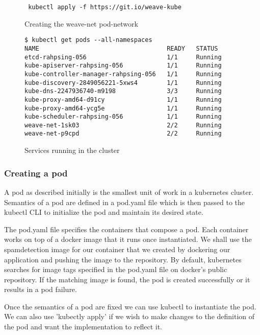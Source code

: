 \documentclass[9pt,twocolumn,twoside]{../../styles/osajnl}
\begin{document}
\begin{figure}[H]
\begin{verbatim}
 kubectl apply -f https://git.io/weave-kube
\end{verbatim}
\caption{Creating the weave-net pod-network}
\label{Creating the weave-net pod-network}
\end{figure}

\begin{figure}[H]
\begin{verbatim}
$ kubectl get pods --all-namespaces
NAME                                   READY   STATUS       
etcd-rahpsing-056                      1/1     Running          
kube-apiserver-rahpsing-056            1/1     Running           
kube-controller-manager-rahpsing-056   1/1     Running           
kube-discovery-2849056221-5xws4        1/1     Running         
kube-dns-2247936740-m9198              3/3     Running           
kube-proxy-amd64-d91cy                 1/1     Running           
kube-proxy-amd64-ycg5e                 1/1     Running           
kube-scheduler-rahpsing-056            1/1     Running           
weave-net-1sk03                        2/2     Running           
weave-net-p9cpd                        2/2     Running           
\end{verbatim}
\caption{Services running in the cluster}
\label{Services running in the cluster}
\end{figure}

\subsubsection{Creating a pod}
A pod as described initially is the smallest unit of work in a
kubernetes cluster. Semantics of a pod are defined in a pod.yaml file
which is then passed to the kubectl CLI to initialize the pod and
maintain its desired state.

The pod.yaml file specifies the containers that compose a pod. Each
container works on top of a docker image that it runs once
instantiated. We shall use the spamdetection image for our container
that we created by dockering our application and pushing the image to
the repository. By default, kubernetes searches for image tags
specified in the pod.yaml file on docker's public repository. If the
matching image is found, the pod is created successfully or it results
in a pod failure.

Once the semantics of a pod are fixed we can use kubectl to
instantiate the pod. We can also use 'kubectly apply' if we wish to
make changes to the definition of the pod and want the implementation
to reflect it.
\end{document}
